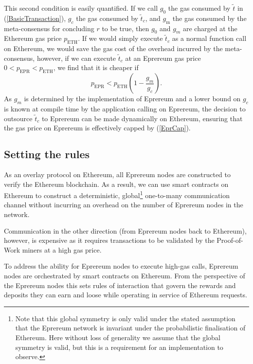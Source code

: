 \documentclass[twocolumn]{article}
\begin{document}
This second condition is easily quantified.  If we call $g_0$ the gas consumed by $\tilde{t}$ in (\ref{BasicTransaction}), $g_c$ the gas consumed by $\tilde{t}_c$, and $g_\text{m}$ the gas consumed by the meta-consensus for concluding $r$ to be true, then $g_0$ and $g_m$ are charged at the Ethereum gas price $p_\text{ETH}$.  If we would simply execute $\tilde{t}_c$ as a normal function call on Ethereum, we would save the gas cost of the overhead incurred by the meta-consensus, however, if we can execute $\tilde{t}_c$ at an Eprereum gas price $0 < p_\text{EPR} < p_\text{ETH}$, we find that it is cheaper if 
\begin{equation} \label{EprCap}
	p_\text{EPR} < p_\text{ETH}\left( 1 - \frac{g_m}{g_c} \right).
\end{equation}
As $g_m$ is determined by the implementation of Eprereum and a lower bound on $g_c$ is known at compile time by the application calling on Eprereum, the decision to outsource $\tilde{t}_c$ to Eprereum can be made dynamically on Ethereum, ensuring that the gas price on Eprereum is effectively capped by (\ref{EprCap}).

\subsection{Setting the rules}

As an overlay protocol on Ethereum, all Eprereum nodes are constructed to verify the Ethereum blockchain.  As a result, we can use smart contracts on Ethereum to construct a deterministic, global\footnote{Note that this global symmetry is only valid under the stated assumption that the Eprereum network is invariant under the probabilistic finalisation of Ethereum.  Here without loss of generality we assume that the global symmetry is valid, but this is a requirement for an implementation to observe.} one-to-many communication channel without incurring an overhead on the number of Eprereum nodes in the network.

Communication in the other direction (from Eprereum nodes back to Ethereum), however, is expensive as it requires transactions to be validated by the Proof-of-Work miners at a high gas price.

To address the ability for Eprereum nodes to execute high-gas calls, Eprereum nodes are orchestrated by smart contracts on Ethereum.  From the perspective of the Eprereum nodes this sets rules of interaction that govern the rewards and deposits they can earn and loose while operating in service of Ethereum requests.
\end{document}
